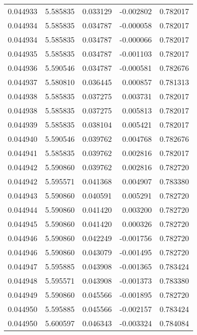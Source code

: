 \begin{tabular}{lrrrr}
0.044933    &  5.585835 &  0.033129 & -0.002802 &             0.782017 \\
0.044934    &  5.585835 &  0.034787 & -0.000058 &             0.782017 \\
0.044934    &  5.585835 &  0.034787 & -0.000066 &             0.782017 \\
0.044935    &  5.585835 &  0.034787 & -0.001103 &             0.782017 \\
0.044936    &  5.590546 &  0.034787 & -0.000581 &             0.782676 \\
0.044937    &  5.580810 &  0.036445 &  0.000857 &             0.781313 \\
0.044938    &  5.585835 &  0.037275 &  0.003731 &             0.782017 \\
0.044938    &  5.585835 &  0.037275 &  0.005813 &             0.782017 \\
0.044939    &  5.585835 &  0.038104 &  0.005421 &             0.782017 \\
0.044940    &  5.590546 &  0.039762 &  0.004768 &             0.782676 \\
0.044941    &  5.585835 &  0.039762 &  0.002816 &             0.782017 \\
0.044942    &  5.590860 &  0.039762 &  0.002816 &             0.782720 \\
0.044942    &  5.595571 &  0.041368 &  0.004907 &             0.783380 \\
0.044943    &  5.590860 &  0.040591 &  0.005291 &             0.782720 \\
0.044944    &  5.590860 &  0.041420 &  0.003200 &             0.782720 \\
0.044945    &  5.590860 &  0.041420 &  0.000326 &             0.782720 \\
0.044946    &  5.590860 &  0.042249 & -0.001756 &             0.782720 \\
0.044946    &  5.590860 &  0.043079 & -0.001495 &             0.782720 \\
0.044947    &  5.595885 &  0.043908 & -0.001365 &             0.783424 \\
0.044948    &  5.595571 &  0.043908 & -0.001373 &             0.783380 \\
0.044949    &  5.590860 &  0.045566 & -0.001895 &             0.782720 \\
0.044950    &  5.595885 &  0.045566 & -0.002157 &             0.783424 \\
0.044950    &  5.600597 &  0.046343 & -0.003324 &             0.784084 \\

\end{tabular}
